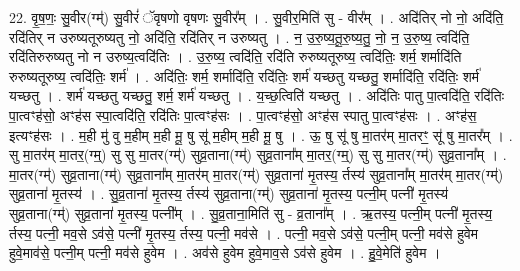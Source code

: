 \documentclass[17pt]{extarticle}
\begin{document}
22. वृ॒ष॒णः॒ सु॒वीर(ग्म्॑) सु॒वीरं॑ ॅवृषणो वृषणः सु॒वीर᳚म् । . सु॒वीर॒मिति॑ सु - वीर᳚म् । . अदि॑तिर् नो नो॒ अदि॑ति॒ रदि॑तिर् न उरुष्यतूरुष्यतु नो॒ अदि॑ति॒ रदि॑तिर् न उरुष्यतु । . न॒ उ॒रु॒ष्य॒तू॒रु॒ष्य॒तु॒ नो॒ न॒ उ॒रु॒ष्य॒ त्वदि॑ति॒ रदि॑तिरुरुष्यतु नो न उरुष्य॒त्वदि॑तिः । . उ॒रु॒ष्य॒ त्वदि॑ति॒ रदि॑ति रुरुष्यतूरुष्य॒ त्वदि॑तिः॒ शर्म॒ शर्मादि॑ति रुरुष्यतूरुष्य॒ त्वदि॑तिः॒ शर्म॑ । . अदि॑तिः॒ शर्म॒ शर्मादि॑ति॒ रदि॑तिः॒ शर्म॑ यच्छतु यच्छतु॒ शर्मादि॑ति॒ रदि॑तिः॒ शर्म॑ यच्छतु । . शर्म॑ यच्छतु यच्छतु॒ शर्म॒ शर्म॑ यच्छतु । . य॒च्छ॒त्विति॑ यच्छतु । . अदि॑तिः पातु पा॒त्वदि॑ति॒ रदि॑तिः पा॒त्वꣳह॑सो॒ अꣳह॑स स्पा॒त्वदि॑ति॒ रदि॑तिः पा॒त्वꣳह॑सः । . पा॒त्वꣳह॑सो॒ अꣳह॑स स्पातु पा॒त्वꣳह॑सः । . अꣳह॑स॒ इत्यꣳह॑सः । . म॒ही मु॑ वु म॒हीम् म॒ही मू॒ षु सू॑ म॒हीम् म॒ही मू॒ षु । . ऊ॒ षु सू॑ षु मा॒तर॑म् मा॒तरꣳ॒॒ सू॑ षु मा॒तर᳚म् । . सु मा॒तर॑म् मा॒तर॒(ग्म्॒) सु सु मा॒तर(ग्म्॑) सुव्र॒ताना(ग्म्॑) सुव्र॒ताना᳚म् मा॒तर॒(ग्म्॒) सु सु मा॒तर(ग्म्॑) सुव्र॒ताना᳚म् । . मा॒तर(ग्म्॑) सुव्र॒ताना(ग्म्॑) सुव्र॒ताना᳚म् मा॒तर॑म् मा॒तर(ग्म्॑) सुव्र॒ताना॑ मृ॒तस्य॒ र्तस्य॑ सुव्र॒ताना᳚म् मा॒तर॑म् मा॒तर(ग्म्॑) सुव्र॒ताना॑ मृ॒तस्य॑ । . सु॒व्र॒ताना॑ मृ॒तस्य॒ र्तस्य॑ सुव्र॒ताना(ग्म्॑) सुव्र॒ताना॑ मृ॒तस्य॒ पत्नी॒म् पत्नी॑ मृ॒तस्य॑ सुव्र॒ताना(ग्म्॑) सुव्र॒ताना॑ मृ॒तस्य॒ पत्नी᳚म् । . सु॒व्र॒ताना॒मिति॑ सु - व्र॒ताना᳚म् । . ऋ॒तस्य॒ पत्नी॒म् पत्नी॑ मृ॒तस्य॒ र्तस्य॒ पत्नी॒ मव॒से ऽव॑से॒ पत्नी॑ मृ॒तस्य॒ र्तस्य॒ पत्नी॒ मव॑से । . पत्नी॒ मव॒से ऽव॑से॒ पत्नी॒म् पत्नी॒ मव॑से हुवेम हुवे॒माव॑से॒ पत्नी॒म् पत्नी॒ मव॑से हुवेम । . अव॑से हुवेम हुवे॒माव॒से ऽव॑से हुवेम । . हु॒वे॒मेति॑ हुवेम । \newline
\end{document}

